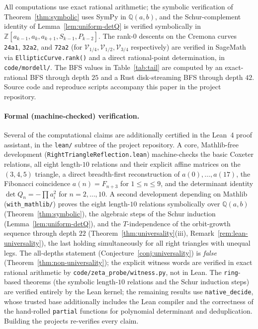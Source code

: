 \documentclass[11pt,a4paper]{article}
\theoremstyle{remark}
\theoremstyle{plain}
\begin{document}
All computations use exact rational arithmetic; the symbolic
verification of Theorem~\ref{thm:symbolic} uses SymPy in
$\mathbb{Q}(a, b)$, and the Schur-complement identity of
Lemma~\ref{lem:uniform-detQ} is verified symbolically in
$\mathbb{Z}[a_{k-1}, a_k, a_{k+1}, S_{k-1}, P_{k-2}]$.  The rank-$0$
descents on the Cremona curves \texttt{24a1}, \texttt{32a2}, and
\texttt{72a2} (for $\mathcal{V}_{1/4}, \mathcal{V}_{1/2},
\mathcal{V}_{3/4}$ respectively) are verified in SageMath via
\texttt{EllipticCurve.rank()} and a direct rational-point determination,
in \texttt{code/mordell/}.  The BFS values in
Table~\ref{tab:tail} are computed by an exact-rational BFS through
depth $25$ and a Rust disk-streaming BFS through depth $42$.  Source
code and reproduce scripts accompany this paper in the project
repository.

\paragraph{Formal (machine-checked) verification.}
Several of the computational claims are additionally certified in the
Lean~4 proof assistant, in the \texttt{lean/} subtree of the project
repository.  A core, Mathlib-free development
(\texttt{RightTriangleReflection.lean}) machine-checks the basic Coxeter
relations, all eight length-$10$ relations and their explicit affine
matrices on the $(3,4,5)$ triangle, a direct breadth-first reconstruction
of $a(0),\dots,a(17)$, the Fibonacci coincidence $a(n) = F_{n+3}$ for
$1 \le n \le 9$, and the determinant identity
$\det Q_n = -\prod a_i^2$ for $n = 2,\dots,10$.  A second development
depending on Mathlib (\texttt{with\_mathlib/}) proves the eight length-$10$
relations symbolically over $\mathbb{Q}(a,b)$
(Theorem~\ref{thm:symbolic}), the algebraic steps of the Schur induction
(Lemma~\ref{lem:uniform-detQ}), and the $T$-independence of the
orbit-growth sequence through depth $22$
(Theorem~\ref{thm:universality}(iii), Remark~\ref{rem:lean-universality}),
the last holding simultaneously for all right triangles with unequal
legs.  The all-depths statement (Conjecture~\ref{conj:universality})
is \emph{false} (Theorem~\ref{thm:non-universality}); the explicit
witness words are verified in exact rational arithmetic by
\texttt{code/zeta\_probe/witness.py}, not in Lean.
The \texttt{ring}-based theorems (the symbolic length-$10$ relations and
the Schur induction steps) are verified entirely by the Lean kernel; the
remaining results use \texttt{native\_decide}, whose trusted base
additionally includes the Lean compiler and the correctness of the
hand-rolled \texttt{partial} functions for polynomial determinant and
deduplication.  Building the projects re-verifies every claim.
\end{document}

